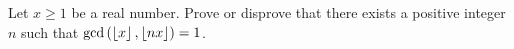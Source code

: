 %
%

\begin{problem}
	Let $x \geq 1$ be a real number. Prove or disprove that there exists a positive integer $n$ such that $\gcd\left(\left\lfloor{x}\right\rfloor, \left\lfloor{nx}\right\rfloor\right)=1$.
\end{problem}

%

